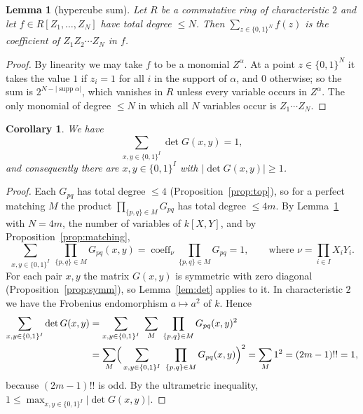 \documentclass[11pt]{amsart}
\newtheorem{lemma}[theorem]{Lemma}
\newtheorem{corollary}[theorem]{Corollary}
\theoremstyle{remark}
\newcommand{\kk}{k}
\newcommand{\coeff}{\operatorname{coeff}}
\newcommand{\abs}[1]{\lvert #1\rvert}
\newcommand{\1}{\mathbf{1}}
\begin{document}
\begin{lemma}[hypercube sum]\label{lem:cube}
Let $R$ be a commutative ring of characteristic $2$ and let $f\in R[Z_1,\dots,Z_N]$ have total degree $\le N$. Then
$\sum_{z\in\{0,1\}^N}f(z)$ is the coefficient of $Z_1Z_2\cdots Z_N$ in $f$.
\end{lemma}
\begin{proof}
By linearity we may take $f$ to be a monomial $Z^\alpha$. At a point $z\in\{0,1\}^N$ it takes the value $1$ if $z_i=1$ for all
$i$ in the support of $\alpha$, and $0$ otherwise; so the sum is $2^{N-\abs{\operatorname{supp}\alpha}}$, which vanishes in $R$
unless every variable occurs in $Z^\alpha$. The only monomial of degree $\le N$ in which all $N$ variables occur is
$Z_1\cdots Z_N$.
\end{proof}

\begin{corollary}\label{cor:point}
We have
\[\sum_{x,y\in\{0,1\}^I}\det G(x,y)=1,\]
and consequently there are $x,y\in\{0,1\}^I$ with $\abs{\det G(x,y)}\ge1$.
\end{corollary}
\begin{proof}
Each $G_{pq}$ has total degree $\le4$ (Proposition~\ref{prop:top}), so for a perfect matching $M$ the product $\prod_{\{p,q\}\in M}G_{pq}$ has total
degree $\le4m$. By Lemma~\ref{lem:cube} with $N=4m$, the number of variables of $\kk[X,Y]$, and by
Proposition~\ref{prop:matching},
\[
\sum_{x,y\in\{0,1\}^I}\ \prod_{\{p,q\}\in M}G_{pq}(x,y)=\coeff_\nu\prod_{\{p,q\}\in M}G_{pq}=1,
\qquad\text{where }\nu=\prod_{i\in I}X_iY_i .
\]
For each pair $x,y$ the
matrix $G(x,y)$ is symmetric with zero diagonal (Proposition~\ref{prop:symm}), so Lemma~\ref{lem:det} applies to it. In
characteristic $2$ we have the Frobenius endomorphism $a\mapsto a^2$ of $\kk$. Hence
\begin{align*}
\sum_{x,y\in\{0,1\}^I}\det G(x,y)
&=\sum_{x,y\in\{0,1\}^I}\ \sum_M\ \prod_{\{p,q\}\in M}G_{pq}(x,y)^2\\
&=\sum_M\Bigl(\,\sum_{x,y\in\{0,1\}^I}\ \prod_{\{p,q\}\in M}G_{pq}(x,y)\Bigr)^2=\sum_M1^2=(2m-1)!!=1,
\end{align*}
because $(2m-1)!!$ is odd. By the ultrametric inequality, $1\le\max_{x,y\in\{0,1\}^I}\abs{\det G(x,y)}$.
\end{proof}
\end{document}
